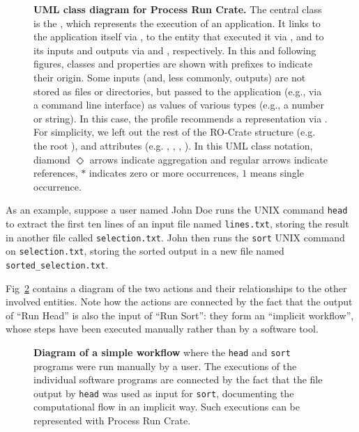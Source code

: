 \begin{figure}[!h]
\caption{{\bf UML class diagram for Process Run Crate.}
The central class is the , which represents the execution of an application.
It links to the application itself via , to the entity that executed it via , and to its inputs and outputs via 
and , respectively.
In this and following figures, classes and properties are shown with prefixes to indicate their origin. %
Some inputs (and, less commonly, outputs) are not stored as files or directories, but passed to the application (e.g., via a command line interface) as values of various types (e.g., a number or string). In this case, the profile recommends a representation via .
For simplicity, we left out the rest of the RO-Crate structure (e.g. the root ), and attributes (e.g. , , , ).
In this UML class notation, diamond $\Diamond$ arrows indicate aggregation and regular arrows indicate references, $*$ indicates zero or more occurrences, $1$ means single occurrence.  
}
\label{fig:wrroc:process_crate_er}
\end{figure}


As an example,
suppose a user named John Doe runs the UNIX command \texttt{head} to extract the first ten lines of an input file named \texttt{lines.txt}, storing the result in another file called \texttt{selection.txt}.
John then runs the \texttt{sort}
UNIX command on \texttt{selection.txt}, storing the sorted output in a new file named \texttt{sorted\_selection.txt}.

Fig~\ref{fig:wrroc:head_sort} contains a diagram of the two actions and their relationships to the other involved entities.
Note how the actions are connected by the fact that the output of ``Run Head'' is also the input of ``Run Sort'': they form an ``implicit workflow'', whose steps have been executed manually rather than by a software tool.

\begin{figure}[!ht]
\caption{{\bf Diagram of a simple workflow} where the \texttt{head} and \texttt{sort} programs were run manually by a user.
The executions of the individual software programs are connected by the fact that the file output by \texttt{head} was used as input for \texttt{sort}, documenting the computational flow in an implicit way.
Such executions can be represented with Process Run Crate.
}
\label{fig:wrroc:head_sort}
\end{figure}


